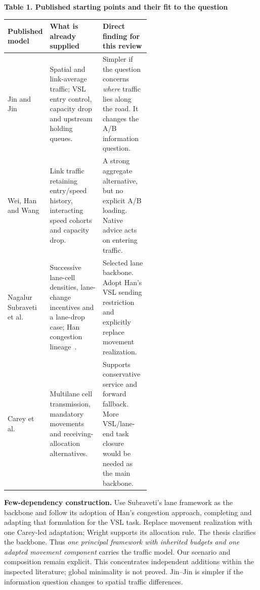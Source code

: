 \documentclass[10pt,a4paper]{article}
\newcommand{\Jin}[1]{\textcolor{SrcJin}{#1}}
\newcommand{\Wei}[1]{\textcolor{SrcWei}{#1}}
\newcommand{\NS}[1]{\textcolor{SrcNS}{#1}}
\newcommand{\Hsix}[1]{\textcolor{SrcHan16}{#1}}
\newcommand{\Hseven}[1]{\textcolor{SrcHan17}{#1}}
\newcommand{\Carey}[1]{\textcolor{SrcCarey}{#1}}
\newcommand{\Wright}[1]{\textcolor{SrcWright}{#1}}
\newcommand{\Own}[1]{\textcolor{Own}{#1}}
\newcommand{\scite}[2]{\textcolor{#1}{\cite{#2}}}
\begin{document}
\begin{center}
\textbf{Table 1. Published starting points and their fit to the question}\par
\vspace{3pt}
\begin{tabularx}{\linewidth}{@{}>{\raggedright\arraybackslash}p{0.19\linewidth}
 >{\raggedright\arraybackslash}p{0.37\linewidth}
 >{\raggedright\arraybackslash}X@{}}
\toprule
Published model & What is already supplied & Direct finding for this review\\
\midrule
\Jin{Jin and Jin}~\scite{SrcJin}{jinjin}
& Spatial and link-average traffic; VSL entry control, capacity drop and
upstream holding queues.
& Simpler if the question concerns \emph{where} traffic lies along the
road. It changes the A/B information question.\\[3pt]
\Wei{Wei, Han and Wang}~\scite{SrcWei}{wei}
& Link traffic retaining entry/speed history, interacting speed cohorts
and capacity drop.
& A strong aggregate alternative, but no explicit A/B loading. Native
advice acts on entering traffic.\\[3pt]
\NS{Nagalur Subraveti et al.}~\scite{SrcNS}{ns}
& Successive lane-cell densities, lane-change incentives and a lane-drop
case; \Hsix{Han congestion lineage}~\scite{SrcHan16}{han16}.
& Selected lane backbone. Adopt \Hseven{Han's VSL sending restriction}~\scite{SrcHan17}{han17}
and explicitly replace movement realization.\\[3pt]
\Carey{Carey et al.}~\scite{SrcCarey}{carey}
& Multilane cell transmission, mandatory movements and receiving-allocation
alternatives.
& Supports conservative service and forward fallback. More VSL/lane-end
task closure would be needed as the main backbone.\\
\bottomrule
\end{tabularx}
\end{center}

\textbf{Few-dependency construction.} Use \NS{Subraveti's lane framework} as
the backbone and follow its adoption of \Hsix{Han's congestion approach},
completing and adapting that formulation for the \Hseven{VSL task}.
Replace movement realization with one \Carey{Carey-led adaptation};
\Wright{Wright} supports its allocation rule. The thesis clarifies the backbone.
Thus \emph{one principal framework with inherited budgets and one adapted
movement component} carries the traffic model. Our \Own{scenario and composition}
remain explicit. This concentrates independent additions within the inspected
literature; global minimality is not proved. Jin--Jin is simpler if the
information question changes to spatial traffic differences.
\end{document}
